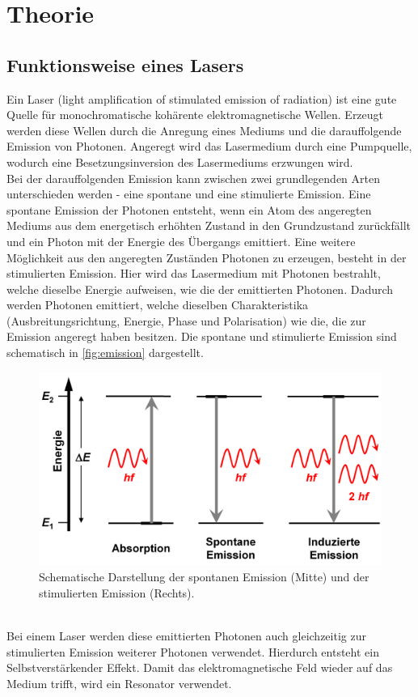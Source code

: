 \chapter{Theorie}
\label{cha:Theorie}

\section{Funktionsweise eines Lasers}

Ein Laser (light amplification of stimulated emission of radiation) ist eine gute Quelle für monochromatische kohärente 
elektromagnetische Wellen. Erzeugt werden diese Wellen durch die Anregung eines Mediums und die darauffolgende Emission
von Photonen. Angeregt wird das Lasermedium durch eine Pumpquelle, wodurch eine Besetzungsinversion des Lasermediums erzwungen wird.\\
Bei der darauffolgenden Emission kann zwischen zwei grundlegenden Arten unterschieden werden - eine spontane und eine stimulierte
Emission. Eine spontane Emission der 
Photonen entsteht, wenn ein Atom des angeregten Mediums aus dem energetisch erhöhten Zustand in den Grundzustand zurückfällt und 
ein Photon mit der Energie des Übergangs emittiert. 
Eine weitere Möglichkeit aus den angeregten Zuständen Photonen zu erzeugen, besteht in der stimulierten Emission. Hier wird
das Lasermedium mit Photonen bestrahlt, welche dieselbe Energie aufweisen, wie die der emittierten Photonen. Dadurch werden Photonen emittiert,
welche dieselben Charakteristika (Ausbreitungsrichtung, Energie, Phase und Polarisation) wie die, die zur Emission angeregt haben besitzen. Die spontane und stimulierte 
Emission sind schematisch in \autoref{fig:emission} dargestellt.
\begin{figure}
    \centering
    \includegraphics[width = \textwidth]{v61_bilder/emission.png}
    \caption{Schematische Darstellung der spontanen Emission (Mitte) und der stimulierten Emission (Rechts).}
    \label{fig:emission}
\end{figure}
\\Bei einem Laser werden diese emittierten Photonen auch gleichzeitig zur stimulierten Emission weiterer Photonen verwendet. Hierdurch
entsteht ein Selbstverstärkender Effekt. Damit das elektromagnetische Feld wieder auf das Medium trifft, wird ein Resonator verwendet.

